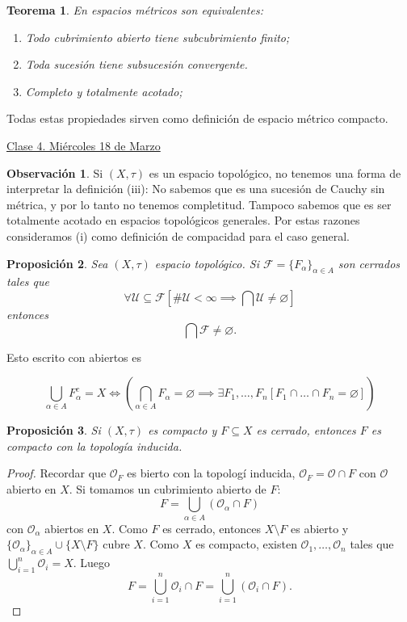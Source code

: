 \documentclass{article}
\newtheorem{theorem}{Teorema}[subsection]
\newtheorem{proposition}[theorem]{Proposición}
\theoremstyle{definition}
\newtheorem*{obs}{Observación}
\theoremstyle{remark}
\numberwithin{equation}{section}
\renewcommand{\O}{\mathcal{O}}
\newcommand{\Fcal}{\mathcal{F}}
\newcommand{\Ucal}{\mathcal{U}}
\renewcommand{\a}{\alpha}
\renewcommand{\t}{\tau}
\newcommand{\oo}{\infty}
\newcommand{\br}[1]{\left( #1 \right)}
\newcommand{\cor}[1]{\left[ #1 \right]}
\newcommand{\ds}{\displaystyle}
\newcommand{\fecha}[1]{\begin{flushright} \underline{#1} \end{flushright}}
\begin{document}
\begin{theorem}
  En espacios métricos son equivalentes:
  \begin{enumerate}[(1)]
    \item Todo cubrimiento abierto tiene subcubrimiento finito;
    \item Toda sucesión tiene subsucesión convergente.
    \item Completo y totalmente acotado;
  \end{enumerate}
\end{theorem}

Todas estas propiedades sirven como definición de espacio métrico compacto.

\fecha{Clase 4. Miércoles 18 de Marzo}

\begin{obs}
  Si $(X,\t)$ es un espacio topológico, no tenemos una forma de interpretar la definición (iii): No sabemos que es una sucesión de Cauchy sin métrica, y por lo tanto no tenemos completitud. Tampoco sabemos que es ser totalmente acotado en espacios topológicos generales. Por estas razones consideramos (i) como definición de compacidad para el caso general.
\end{obs}

\begin{proposition}
  Sea $(X,\t)$ espacio topológico. Si $\Fcal = \{F_\a\}_{\a \in A}$ son cerrados tales que $$\forall \Ucal \subseteq \Fcal \cor{\#\Ucal < \oo \implies \bigcap \Ucal \neq \varnothing}$$ entonces $$\bigcap \Fcal \neq \varnothing.$$
\end{proposition}

Esto escrito con abiertos es

\[\bigcup_{\a \in A} F_\a^c = X \iff \br{\bigcap_{\a \in A} F_\a = \varnothing \implies \exists F_1,\dots,F_n \cor{F_1 \cap \dots \cap F_n = \varnothing}}\]

\begin{proposition}
  Si $(X,\t)$ es compacto y $F \subseteq X$ es cerrado, entonces $F$ es compacto con la topología inducida.
\end{proposition}
\begin{proof}
  Recordar que $\O_F$ es bierto con la topologí inducida, $\O_F = \O \cap F$ con $\O$ abierto en $X$. Si tomamos un cubrimiento abierto de $F$:
  \[F = \bigcup_{\a \in A} (\O_\a \cap F)\]
  con $\O_\a$ abiertos en $X$. Como $F$ es cerrado, entonces $X \setminus F$ es abierto y $\{\O_\a\}_{\a \in A} \cup \{X \setminus F\}$ cubre $X$. Como $X$ es compacto, existen $\O_1, \dots, \O_n$ tales que $\ds \bigcup_{i=1}^n \O_i = X$. Luego
  \[F = \bigcup_{i=1}^n \O_i \cap F = \bigcup_{i=1}^n (\O_i \cap F).\]
\end{proof}
\end{document}
